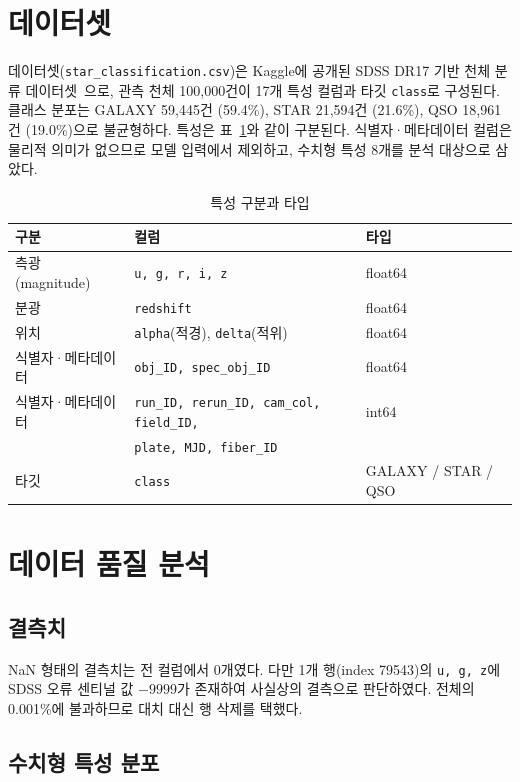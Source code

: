 \documentclass[11pt,a4paper]{article}
\begin{document}
\section{데이터셋}

데이터셋(\texttt{star\_classification.csv})은 Kaggle에 공개된 SDSS DR17 기반
천체 분류 데이터셋~\cite{fedesoriano-sdss17}으로, 관측 천체 100{,}000건이
17개 특성 컬럼과 타깃 \texttt{class}로 구성된다. 클래스 분포는 GALAXY 59{,}445건
(59.4\%), STAR 21{,}594건 (21.6\%), QSO 18{,}961건 (19.0\%)으로 불균형하다.
특성은 표~\ref{tab:features}와 같이 구분된다. 식별자·메타데이터 컬럼은 물리적
의미가 없으므로 모델 입력에서 제외하고, 수치형 특성 8개를 분석 대상으로 삼았다.

\begin{table}[htbp]
\centering
\caption{특성 구분과 타입}
\label{tab:features}
\small
\begin{tabular}{lll}
\toprule
구분 & 컬럼 & 타입 \\
\midrule
측광 (magnitude) & \texttt{u, g, r, i, z} & float64 \\
분광 & \texttt{redshift} & float64 \\
위치 & \texttt{alpha}(적경), \texttt{delta}(적위) & float64 \\
식별자·메타데이터 & \texttt{obj\_ID, spec\_obj\_ID} & float64 \\
식별자·메타데이터 & \texttt{run\_ID, rerun\_ID, cam\_col, field\_ID,} & int64 \\
 & \texttt{plate, MJD, fiber\_ID} & \\
타깃 & \texttt{class} & GALAXY / STAR / QSO \\
\bottomrule
\end{tabular}
\end{table}

\section{데이터 품질 분석}

\subsection{결측치}

NaN 형태의 결측치는 전 컬럼에서 0개였다. 다만 1개 행(index 79543)의
\texttt{u, g, z}에 SDSS 오류 센티널 값 $-9999$가 존재하여 사실상의 결측으로
판단하였다. 전체의 0.001\%에 불과하므로 대치 대신 행 삭제를 택했다.

\subsection{수치형 특성 분포}
\end{document}
